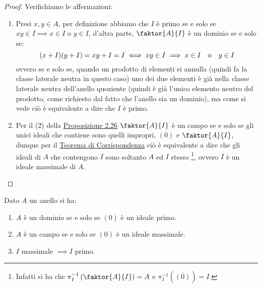 \documentclass[11pt]{scrartcl}
\begin{document}
\begin{proof}
    Verifichiamo le affermazioni:
    \begin{enumerate}[(1)]
        \item Presi $x,y \in A$, per definizione abbiamo che $I$ è primo se e solo se $xy \in I \implies x \in I$ o $y \in I$, d'altra parte, $\faktor{A}{I}$ è un dominio se e solo se:
            \[ (x+I)(y+I) = xy + I = I \iff xy \in I \implies x \in I \quad\text o\quad y \in I
                \]
            ovvero se e solo se, quando un prodotto di elementi si annulla (quindi fa la classe laterale neutra in questo caso) uno dei due elementi è già nella classe laterale neutra 
            dell'anello quoziente (quindi è già l'unico elemento neutro del prodotto, come richiesto dal fatto che l'anello sia un dominio), ma come si vede ciò è equivalente a dire che $I$ è primo.
        \item Per il (2) della \hyperref[2.26]{Proposizione 2.26} $\faktor{A}{I}$ è un campo se e solo se gli unici ideali che contiene sono quelli impropri, $\overline{(0)}$ e $\faktor{A}{I}$, dunque per il 
        \hyperref[corrispondenza]{Teorema di Corrispondenza} ciò è equivalente a dire che gli ideali di $A$ che contengono $I$ sono soltanto $A$ ed $I$ stesso \footnote{Infatti si ha che
        $\pi_I^{-1}\left(\faktor{A}{I}\right) = A$ e $\pi_I^{-1}(\overline{(0)}) = I$.}, ovvero $I$ è un ideale massimale di $A$.
    \end{enumerate}
\end{proof}

\begin{corollary}
    \label{2.57}
    Dato $A$ un anello si ha:
    \begin{enumerate}[(1)]
        \item $A$ è un dominio se e solo se $(0)$ è un ideale primo.
        \item $A$ è un campo se e solo se $(0)$ è un ideale massimale.
        \item $I$ massimale $\implies I$ primo.
    \end{enumerate}
\end{corollary}
\end{document}
